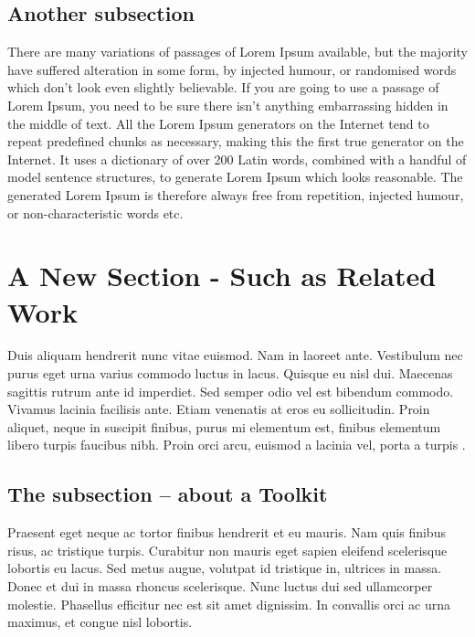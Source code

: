 \documentclass[11pt, fullpage]{article}
\begin{document}
\subsection{Another subsection} 
There are many variations of passages of Lorem Ipsum available, but the majority have suffered alteration in some form, by injected humour, or randomised words which don't look even slightly believable. If you are going to use a passage of Lorem Ipsum, you need to be sure there isn't anything embarrassing hidden in the middle of text. All the Lorem Ipsum generators on the Internet tend to repeat predefined chunks as necessary, making this the first true generator on the Internet. It uses a dictionary of over 200 Latin words, combined with a handful of model sentence structures, to generate Lorem Ipsum which looks reasonable. The generated Lorem Ipsum is therefore always free from repetition, injected humour, or non-characteristic words etc.

\pagebreak

\section[\bf \uppercase{A New Section - Such as Related Work}]{A New Section - Such as Related Work}
\label{sec-rl}

Duis aliquam hendrerit nunc vitae euismod. Nam in laoreet ante. Vestibulum nec purus eget urna varius commodo luctus in lacus. Quisque eu nisl dui. Maecenas sagittis rutrum ante id imperdiet. Sed semper odio vel est bibendum commodo. Vivamus lacinia facilisis ante. Etiam venenatis at eros eu sollicitudin. Proin aliquet, neque in suscipit finibus, purus mi elementum est, finibus elementum libero turpis faucibus nibh. Proin orci arcu, euismod a lacinia vel, porta a turpis \cite{apples1}.

\subsection{The subsection -- about a Toolkit}

Praesent eget neque ac tortor finibus hendrerit et eu mauris. Nam quis finibus risus, ac tristique turpis. Curabitur non mauris eget sapien eleifend scelerisque lobortis eu lacus. Sed metus augue, volutpat id tristique in, ultrices in massa. Donec et dui in massa rhoncus scelerisque. Nunc luctus dui sed ullamcorper molestie. Phasellus efficitur nec est sit amet dignissim. In convallis orci ac urna maximus, et congue nisl lobortis.
\end{document}
